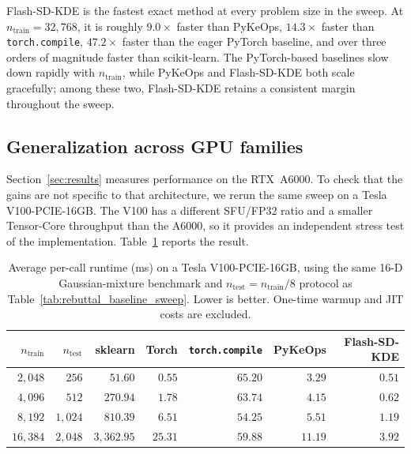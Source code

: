 Flash-SD-KDE is the fastest exact method at every problem size in the sweep.
At $n_{\text{train}} = 32{,}768$, it is roughly $9.0\times$ faster than PyKeOps,
$14.3\times$ faster than \texttt{torch.compile}, $47.2\times$ faster than the
eager PyTorch baseline, and over three orders of magnitude faster than
scikit-learn.
The PyTorch-based baselines slow down rapidly with $n_{\text{train}}$,
while PyKeOps and Flash-SD-KDE both scale gracefully; among these two,
Flash-SD-KDE retains a consistent margin throughout the sweep.


\subsection{Generalization across GPU families}
\label{app:hardware}

Section~\ref{sec:results} measures performance on the RTX~A6000.
To check that the gains are not specific to that architecture, we rerun the
same sweep on a Tesla V100-PCIE-16GB.
The V100 has a different SFU/FP32 ratio and a smaller Tensor-Core throughput
than the A6000, so it provides an independent stress test of the
implementation.
Table~\ref{tab:rebuttal_v100} reports the result.

\begin{table}[t]
  \centering
  \small
  \setlength{\tabcolsep}{4pt}
  \begin{tabular}{rrrrrrr}
    \toprule
    $n_{\text{train}}$ & $n_{\text{test}}$ &
    sklearn & Torch & \texttt{torch.compile} & PyKeOps & Flash-SD-KDE \\
    \midrule
    $2{,}048$  & $256$  & $51.60$   & $0.55$  & $65.20$ & $3.29$  & $0.51$ \\
    $4{,}096$  & $512$  & $270.94$  & $1.78$  & $63.74$ & $4.15$  & $0.62$ \\
    $8{,}192$  & $1{,}024$ & $810.39$  & $6.51$  & $54.25$ & $5.51$  & $1.19$ \\
    $16{,}384$ & $2{,}048$ & $3{,}362.95$ & $25.31$ & $59.88$ & $11.19$ & $3.92$ \\
    \bottomrule
  \end{tabular}
  \caption{Average per-call runtime (ms) on a Tesla V100-PCIE-16GB,
           using the same 16-D Gaussian-mixture benchmark and
           $n_{\text{test}} = n_{\text{train}}/8$ protocol as
           Table~\ref{tab:rebuttal_baseline_sweep}.
           Lower is better.
           One-time warmup and JIT costs are excluded.}
  \label{tab:rebuttal_v100}
\end{table}

